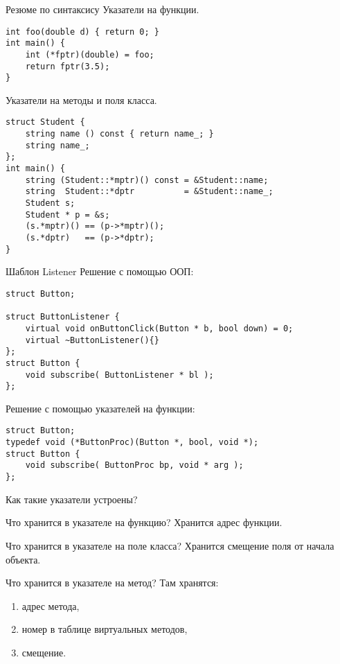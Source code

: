 \documentclass{beamer}
\begin{document}
\begin{frame}[fragile]{Резюме по синтаксису}
\small    
 Указатели на функции. 
    \begin{lstlisting}
int foo(double d) { return 0; }
int main() {
    int (*fptr)(double) = foo;
    return fptr(3.5);
}
    \end{lstlisting}

Указатели на методы и поля класса. 
    \begin{lstlisting}
struct Student { 
    string name () const { return name_; } 
    string name_;
};
int main() {
    string (Student::*mptr)() const = &Student::name;
    string  Student::*dptr          = &Student::name_;
    Student s;
    Student * p = &s;
    (s.*mptr)() == (p->*mptr)();
    (s.*dptr)   == (p->*dptr);
}
    \end{lstlisting}

\end{frame}

\begin{frame}[fragile]{Шаблон Listener}
    Решение с помощью ООП:
\begin{lstlisting}
struct Button;

struct ButtonListener {
    virtual void onButtonClick(Button * b, bool down) = 0;
    virtual ~ButtonListener(){}
};
struct Button {
    void subscribe( ButtonListener * bl );
};
    \end{lstlisting}

Решение с помощью указателей на функции:
    \begin{lstlisting}
struct Button;
typedef void (*ButtonProc)(Button *, bool, void *);
struct Button {
    void subscribe( ButtonProc bp, void * arg );
};
    \end{lstlisting}
\end{frame}

\begin{frame}[fragile]{Как такие указатели устроены?}
    \begin{block}{Что хранится в указателе на функцию?}
        \pause Хранится адрес функции.
    \end{block}

    \begin{block}{Что хранится в указателе на поле класса?}
        \pause
        Хранится смещение поля от начала объекта.
    \end{block}

    \begin{block}{Что хранится в указателе на метод?}
        \pause
        Там хранятся:
        \begin{enumerate}
            \item адрес метода,
            \item номер в таблице виртуальных методов,
            \item смещение.
        \end{enumerate}
    \end{block}

\end{frame}
\end{document}
